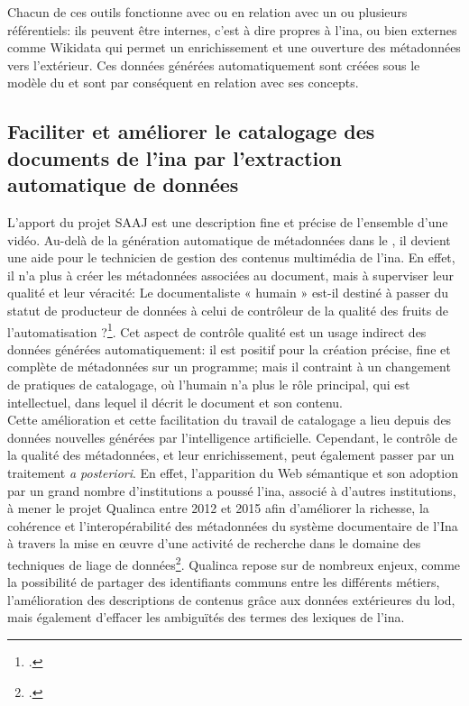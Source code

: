 Chacun de ces outils fonctionne avec ou en relation avec un ou plusieurs référentiels: ils peuvent être internes, c'est à dire propres à l'\ac{ina}, ou bien externes comme Wikidata qui permet un enrichissement et une ouverture des métadonnées vers l'extérieur. Ces données générées automatiquement sont créées sous le modèle du \ldd et sont par conséquent en relation avec ses concepts. 

\subsection{\label{III-B-3-b}Faciliter et améliorer le catalogage des documents de l’\ac{ina} par l’extraction automatique de données}

L'apport du projet SAAJ est une description fine et précise de l'ensemble d'une vidéo. Au-delà de la génération automatique de métadonnées dans le \ldd, il devient une aide pour le technicien de gestion des contenus multimédia de l'\ac{ina}. En effet, il n'a plus à créer les métadonnées associées au document, mais à superviser leur qualité et leur véracité: \og Le documentaliste « humain » est-il destiné à
passer du statut de producteur de données à celui de contrôleur de la qualité des fruits de l’automatisation ?\fg{}\footcite[p.134]{alquier_production_2017}. Cet aspect de contrôle qualité est un usage indirect des données générées automatiquement: il est positif pour la création précise, fine et complète de métadonnées sur un programme; mais il contraint à un changement de pratiques de catalogage, où l'humain n'a plus le rôle principal, qui est intellectuel, dans lequel il décrit le document et son contenu. \\

Cette amélioration et cette facilitation du travail de catalogage a lieu depuis des données nouvelles générées par l'intelligence artificielle. Cependant, le contrôle de la qualité des métadonnées, et leur enrichissement, peut également passer par un traitement \textit{a posteriori}. En effet, l'apparition du Web sémantique et son adoption par un grand nombre d'institutions a poussé l'\ac{ina}, associé à d'autres institutions, à mener le projet Qualinca entre 2012 et 2015 afin \og d'améliorer la richesse, la cohérence et l’interopérabilité des métadonnées du système documentaire de l’Ina à travers la mise en œuvre d’une activité de recherche dans le domaine des techniques de liage de données\fg{}\footcite[p.129]{alquier_production_2017}. Qualinca repose sur de nombreux enjeux, comme la possibilité de partager des identifiants communs entre les différents métiers, l'amélioration des descriptions de contenus grâce aux données extérieures du \ac{lod}, mais également d'effacer les ambiguïtés des termes des lexiques de l'\ac{ina}.\\

